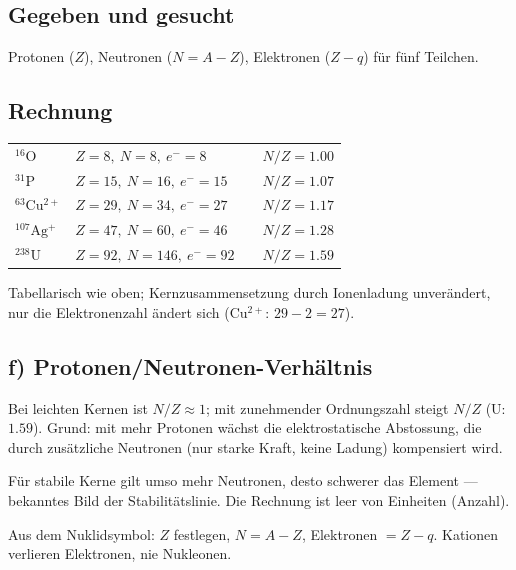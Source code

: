 
\subsection*{Gegeben und gesucht}
Protonen ($Z$), Neutronen ($N=A-Z$), Elektronen ($Z-q$) für fünf Teilchen.

\subsection*{Rechnung}
\begin{center}
\begin{tabular}{llll}
$\mathrm{{}^{16}O}$    & $Z{=}8,\  N{=}8,\  e^{-}{=}8$    & & $N/Z=1.00$\\
$\mathrm{{}^{31}P}$    & $Z{=}15,\ N{=}16,\ e^{-}{=}15$ & & $N/Z=1.07$\\
$\mathrm{{}^{63}Cu^{2+}}$ & $Z{=}29,\ N{=}34,\ e^{-}{=}27$ & & $N/Z=1.17$\\
$\mathrm{{}^{107}Ag^{+}}$ & $Z{=}47,\ N{=}60,\ e^{-}{=}46$ & & $N/Z=1.28$\\
$\mathrm{{}^{238}U}$   & $Z{=}92,\ N{=}146,\ e^{-}{=}92$ & & $N/Z=1.59$
\end{tabular}
\end{center}

\begin{ergebnis}
Tabellarisch wie oben; Kernzusammensetzung durch Ionenladung unverändert,
nur die Elektronenzahl ändert sich ($\mathrm{Cu^{2+}}$: $29-2=27$).
\end{ergebnis}

\subsection*{f) Protonen/Neutronen-Verhältnis}
Bei leichten Kernen ist $N/Z\approx1$; mit zunehmender Ordnungszahl steigt
$N/Z$ (U: $1.59$). Grund: mit mehr Protonen wächst die elektrostatische
Abstossung, die durch zusätzliche Neutronen (nur starke Kraft, keine Ladung)
kompensiert wird.

\begin{kontrolle}
Für stabile Kerne gilt umso mehr Neutronen, desto schwerer das Element ---
bekanntes Bild der Stabilitätslinie. Die Rechnung ist leer von Einheiten
(Anzahl).
\end{kontrolle}

\begin{merksatz}
Aus dem Nuklidsymbol: $Z$ festlegen, $N=A-Z$, Elektronen $=Z-q$. Kationen
verlieren Elektronen, nie Nukleonen.
\end{merksatz}
